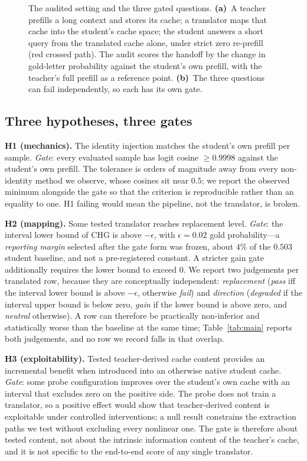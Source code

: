 \documentclass{article} %
\begin{document}
\begin{figure}[t]
\centering

\caption{The audited setting and the three gated questions. \textbf{(a)}~A
teacher prefills a long context and stores its cache; a translator maps that
cache into the student's cache space; the student answers a short query from the
translated cache alone, under strict zero re-prefill (red crossed path). The
audit scores the handoff by the change in gold-letter probability against the
student's own prefill, with the teacher's full prefill as a reference point.
\textbf{(b)}~The three questions can fail independently, so each has its own
gate.}
\label{fig:framework}
\end{figure}

\subsection{Three hypotheses, three gates}
\textbf{H1 (mechanics).} The identity injection matches the student's own
prefill per sample. \emph{Gate}: every evaluated sample has logit cosine
$\ge 0.9998$ against the student's own prefill. The tolerance is orders of
magnitude away from every non-identity method we observe, whose cosines sit near
$0.5$; we report the observed minimum alongside the gate so that the criterion
is reproducible rather than an equality to one. H1 failing would mean the
pipeline, not the translator, is broken.

\textbf{H2 (mapping).} Some tested translator reaches replacement level.
\emph{Gate}: the interval lower bound of CHG is above $-\epsilon$, with
$\epsilon=0.02$ gold probability---a \emph{reporting margin} selected after the
gate form was frozen, about $4\%$ of the $0.503$ student baseline, and not a
pre-registered constant. A stricter gain gate additionally requires the lower
bound to exceed $0$. We report two judgements per translated row, because they
are conceptually independent: \emph{replacement} (\emph{pass} iff the interval
lower bound is above $-\epsilon$, otherwise \emph{fail}) and \emph{direction}
(\emph{degraded} if the interval upper bound is below zero, \emph{gain} if the
lower bound is above zero, and \emph{neutral} otherwise). A row can therefore be
practically non-inferior and statistically worse than the baseline at the same
time; Table~\ref{tab:main} reports both judgements, and no row we record falls in
that overlap.

\textbf{H3 (exploitability).} Tested teacher-derived cache content provides an
incremental benefit when introduced into an otherwise native student cache.
\emph{Gate}: some probe configuration improves over the student's own cache with
an interval that excludes zero on the positive side. The probe does not train a
translator, so a positive effect would show that teacher-derived content is
exploitable under controlled interventions; a null result constrains the
extraction paths we test without excluding every nonlinear one. The gate is
therefore about tested content, not about the intrinsic information content of
the teacher's cache, and it is not specific to the end-to-end score of any
single translator.
\end{document}
